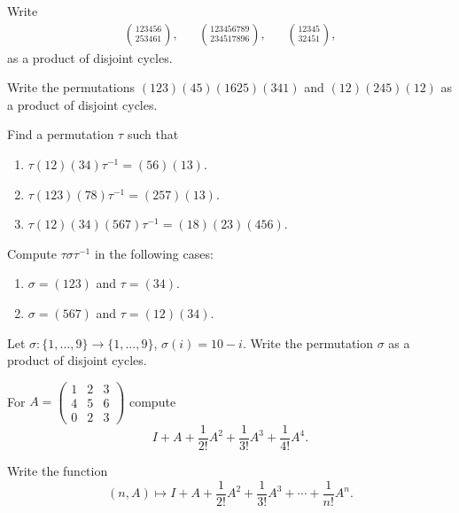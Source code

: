\begin{prob}
    Write 
    \begin{align*}
	\binom{123456}{253461},
    &&
    \binom{123456789}{234517896},
    &&
    \binom{12345}{32451},
    \end{align*}
    as a product of disjoint cycles. 
\end{prob}

\begin{prob}
    Write the permutations 
    $(123)(45)(1625)(341)$ and 
    $(12)(245)(12)$
    as a product of disjoint cycles.
\end{prob}

\begin{prob}
    Find a permutation $\tau$ such that 
    \begin{enumerate}[label=(\alph*)]
        \item $\tau(12)(34)\tau^{-1}=(56)(13)$.
        \item $\tau(123)(78)\tau^{-1}=(257)(13)$.
        \item $\tau(12)(34)(567)\tau^{-1}=(18)(23)(456)$.
    \end{enumerate}
\end{prob}

\begin{prob}
    Compute $\tau\sigma\tau^{-1}$ in the following cases:
    \begin{enumerate}[label=(\alph*)]
        \item $\sigma=(123)$ and $\tau=(34)$.
        \item $\sigma=(567)$ and $\tau=(12)(34)$.
    \end{enumerate}
\end{prob}

\begin{prob}
  Let $\sigma\colon\{1,\dots,9\}\to\{1,\dots,9\}$,
  $\sigma(i)=10-i$. Write the permutation 
  $\sigma$ as a product of disjoint cycles.
\end{prob}

\begin{prob}
   For   
    $A=\begin{pmatrix}
        1 & 2 & 3\\
        4 & 5 & 6\\
        0 & 2 & 3
    \end{pmatrix}$ compute 
    \[
    I+A+\frac{1}{2!}A^2+\frac{1}{3!}A^3+\frac{1}{4!}A^{4}.
    \]
\end{prob}

\begin{prob}
    Write the function
    \[
    (n,A)\mapsto I+A+\frac{1}{2!}A^2+\frac{1}{3!}A^3+\cdots+\frac{1}{n!}A^{n}.
    \]
\end{prob}


